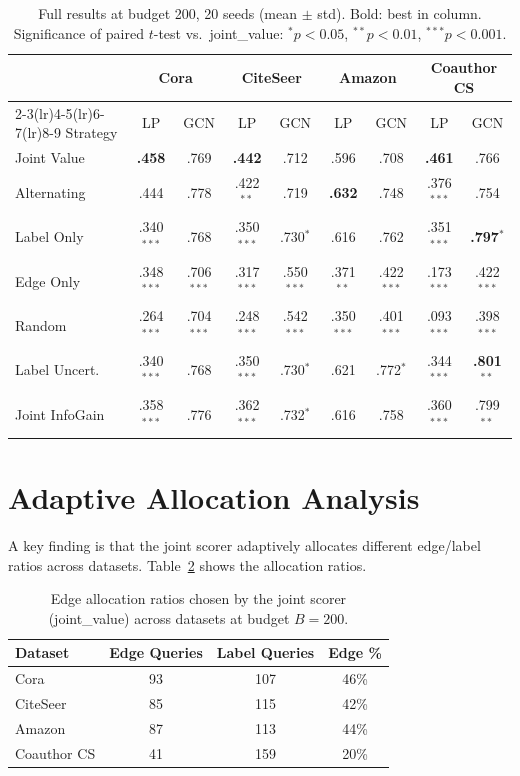 \documentclass[12pt,a4paper,oneside]{report}
\begin{document}
\begin{table}[htbp]
\centering
\caption{Full results at budget 200, 20 seeds (mean $\pm$ std). Bold: best in column. Significance of paired $t$-test vs.\ joint\_value: $^{*}p<0.05$, $^{**}p<0.01$, $^{***}p<0.001$.}
\label{tab:full_results}
\small
\begin{tabular}{l@{\hskip 6pt}cc@{\hskip 8pt}cc@{\hskip 8pt}cc@{\hskip 8pt}cc}
\toprule
 & \multicolumn{2}{c}{Cora} & \multicolumn{2}{c}{CiteSeer} & \multicolumn{2}{c}{Amazon} & \multicolumn{2}{c}{Coauthor CS} \\
\cmidrule(lr){2-3}\cmidrule(lr){4-5}\cmidrule(lr){6-7}\cmidrule(lr){8-9}
Strategy & LP & GCN & LP & GCN & LP & GCN & LP & GCN \\
\midrule
Joint Value   & \textbf{.458} & .769 & \textbf{.442} & .712 & .596 & .708 & \textbf{.461} & .766 \\
Alternating   & .444 & .778 & .422$^{**}$ & .719 & \textbf{.632} & .748 & .376$^{***}$ & .754 \\
Label Only    & .340$^{***}$ & .768 & .350$^{***}$ & .730$^{*}$ & .616 & .762 & .351$^{***}$ & \textbf{.797}$^{*}$ \\
Edge Only     & .348$^{***}$ & .706$^{***}$ & .317$^{***}$ & .550$^{***}$ & .371$^{**}$ & .422$^{***}$ & .173$^{***}$ & .422$^{***}$ \\
Random        & .264$^{***}$ & .704$^{***}$ & .248$^{***}$ & .542$^{***}$ & .350$^{***}$ & .401$^{***}$ & .093$^{***}$ & .398$^{***}$ \\
Label Uncert. & .340$^{***}$ & .768 & .350$^{***}$ & .730$^{*}$ & .621 & .772$^{*}$ & .344$^{***}$ & \textbf{.801}$^{**}$ \\
Joint InfoGain & .358$^{***}$ & .776 & .362$^{***}$ & .732$^{*}$ & .616 & .758 & .360$^{***}$ & .799$^{**}$ \\
\bottomrule
\end{tabular}
\end{table}

\section{Adaptive Allocation Analysis}

A key finding is that the joint scorer adaptively allocates different edge/label ratios across datasets. Table~\ref{tab:allocation} shows the allocation ratios.

\begin{table}[htbp]
\centering
\caption{Edge allocation ratios chosen by the joint scorer (joint\_value) across datasets at budget $B=200$.}
\label{tab:allocation}
\small
\begin{tabular}{lccc}
\toprule
Dataset & Edge Queries & Label Queries & Edge \% \\
\midrule
Cora        & 93  & 107 & 46\% \\
CiteSeer    & 85  & 115 & 42\% \\
Amazon      & 87  & 113 & 44\% \\
Coauthor CS & 41  & 159 & 20\% \\
\bottomrule
\end{tabular}
\end{table}
\end{document}
